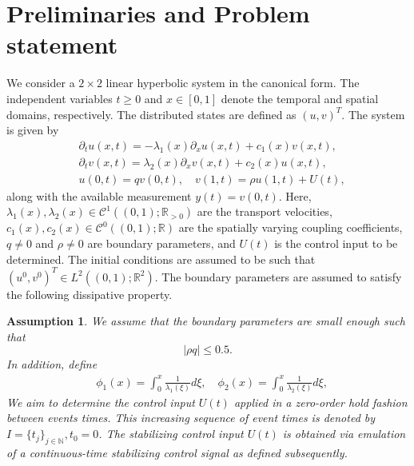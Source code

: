 \documentclass[letterpaper, 10 pt, conference]{ieeeconf}
\newtheorem{assumption}{Assumption}
\begin{document}
\section{Preliminaries and Problem statement}\label{sec:problem_statement}
We consider a $2\times2$ linear hyperbolic system in the canonical form. The independent variables $t\geq0$ and $x\in[0,1]$ denote the temporal and spatial domains, respectively. The distributed states are defined as $(u,v)^T$. The system is given by
\begin{align}
    &\partial_t u(x,t) = -\lambda_1(x) \partial_x u(x,t) + c_1(x) v(x,t),\label{sysu}\\
    &\partial_t v(x,t) = \lambda_2(x) \partial_x v(x,t) + c_2(x) u(x,t),\label{sysv}\\
    &u(0,t) =q v(0,t),\quad
    v(1,t) = \rho u(1,t) + U(t),\label{sysbc}
\end{align}
along with the available measurement $y(t)=v(0,t)$. Here, $\lambda_1(x),\lambda_2(x)\in \mathcal{C}^1((0,1);\mathbb{R}_{>0})$ are the transport velocities, $c_1(x),c_2(x)\in \mathcal{C}^0((0,1);\mathbb{R})$ are the spatially varying coupling coefficients, $q\neq0$ and $\rho\neq0$ are boundary parameters, and $U(t)$ is the control input to be determined. The initial conditions are assumed to be such that $(u^0,  v^0)^T \in  L^2((0, 1);\mathbb{R}^2)$. The boundary parameters are assumed to satisfy the following dissipative property.
\begin{assumption}\label{assum:rhoq}
We assume that the boundary parameters are small enough such that
\begin{equation}
    |\rho q|\leq 0.5.
\end{equation}
In addition, define
\begin{align}
    &\phi_1(x)=\int_0^x \tfrac{1}{\lambda_1(\xi)}d\xi,\quad \phi_2(x)=\int_0^x \tfrac{1}{\lambda_2(\xi)}d\xi,\label{phi}
\end{align}
We aim to determine the control input $U(t)$ applied in a zero-order hold fashion between events times. This increasing sequence of event times is denoted by  $I=\{t_j\}_{j\in\mathbb{N}},t_0=0$. The stabilizing control input $U(t)$ is obtained via emulation of a continuous-time stabilizing control signal as defined subsequently. 
\end{assumption}
\end{document}
